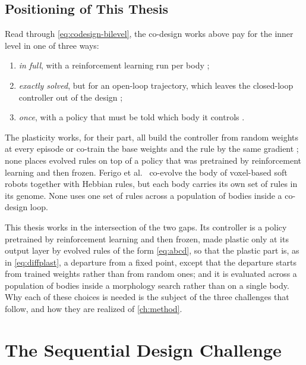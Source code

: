\subsection{Positioning of This Thesis}
\label{subsec:rw-positioning}

Read through \eqref{eq:codesign-bilevel}, the co-design works above pay for the inner level in one of three ways:
\begin{enumerate}
    \item \emph{in full}, with a reinforcement learning run per body \cite{gupta2021embodied, muff2026hexacopters};
    \item \emph{exactly solved}, but for an open-loop trajectory, which leaves the closed-loop controller out of the design \cite{bergonti2024codesign};
    \item \emph{once}, with a policy that must be told which body it controls \cite{gupta2022metamorph}.
\end{enumerate}
The plasticity works, for their part, all build the controller from random weights at every episode \cite{floreano2000evolutionary, najarro2020meta, ferigo2023evolving, vandiggelen2025emergent} or co-train the base weights and the rule by the same gradient \cite{miconi2018differentiable}; none places evolved rules on top of a policy that was pretrained by reinforcement learning and then frozen. Ferigo et al.\ \cite{ferigo2025totipotent} co-evolve the body of voxel-based soft robots together with Hebbian rules, but each body carries its own set of rules in its genome. None uses one set of rules across a population of bodies inside a co-design loop.

This thesis works in the intersection of the two gaps. Its controller is a policy pretrained by reinforcement learning and then frozen, made plastic only at its output layer by evolved rules of the form \eqref{eq:abcd}, so that the plastic part is, as in \eqref{eq:diffplast}, a departure from a fixed point, except that the departure starts from trained weights rather than from random ones; and it is evaluated across a population of bodies inside a morphology search rather than on a single body. Why each of these choices is needed is the subject of the three challenges that follow, and how they are realized of \autoref{ch:method}.

\section{The Sequential Design Challenge}
\label{sec:challenge-sequential}

